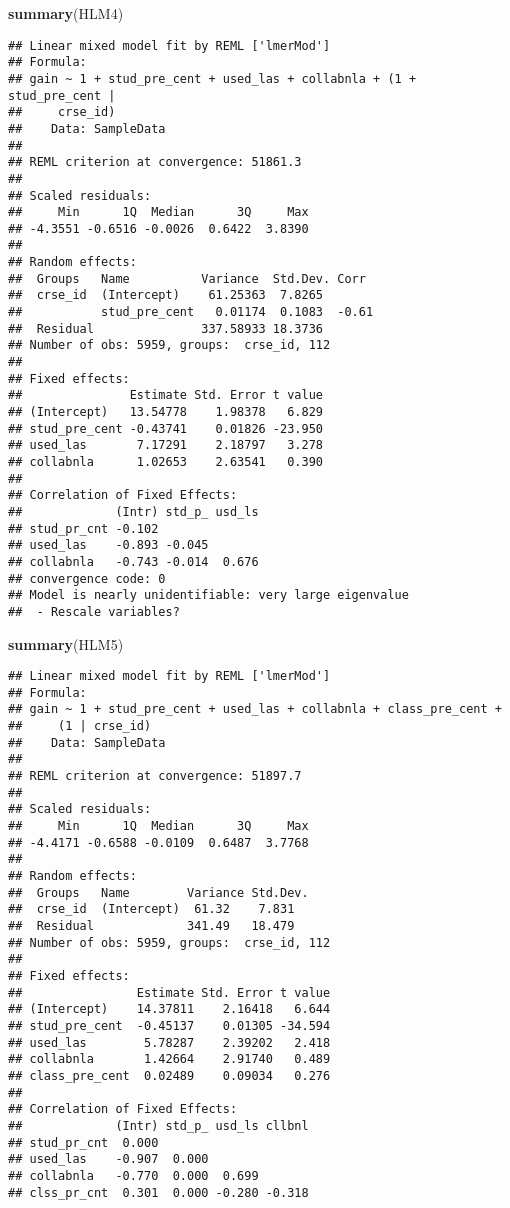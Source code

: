 \documentclass[]{article}
\newenvironment{Shaded}{\begin{snugshade}}{\end{snugshade}}
\newcommand{\KeywordTok}[1]{\textcolor[rgb]{0.13,0.29,0.53}{\textbf{#1}}}
\newcommand{\NormalTok}[1]{#1}
\begin{document}
\begin{Shaded}
\begin{Highlighting}[]
\KeywordTok{summary}\NormalTok{(HLM4)}
\end{Highlighting}
\end{Shaded}

\begin{verbatim}
## Linear mixed model fit by REML ['lmerMod']
## Formula: 
## gain ~ 1 + stud_pre_cent + used_las + collabnla + (1 + stud_pre_cent |  
##     crse_id)
##    Data: SampleData
## 
## REML criterion at convergence: 51861.3
## 
## Scaled residuals: 
##     Min      1Q  Median      3Q     Max 
## -4.3551 -0.6516 -0.0026  0.6422  3.8390 
## 
## Random effects:
##  Groups   Name          Variance  Std.Dev. Corr 
##  crse_id  (Intercept)    61.25363  7.8265       
##           stud_pre_cent   0.01174  0.1083  -0.61
##  Residual               337.58933 18.3736       
## Number of obs: 5959, groups:  crse_id, 112
## 
## Fixed effects:
##               Estimate Std. Error t value
## (Intercept)   13.54778    1.98378   6.829
## stud_pre_cent -0.43741    0.01826 -23.950
## used_las       7.17291    2.18797   3.278
## collabnla      1.02653    2.63541   0.390
## 
## Correlation of Fixed Effects:
##             (Intr) std_p_ usd_ls
## stud_pr_cnt -0.102              
## used_las    -0.893 -0.045       
## collabnla   -0.743 -0.014  0.676
## convergence code: 0
## Model is nearly unidentifiable: very large eigenvalue
##  - Rescale variables?
\end{verbatim}

\begin{Shaded}
\begin{Highlighting}[]
\KeywordTok{summary}\NormalTok{(HLM5)}
\end{Highlighting}
\end{Shaded}

\begin{verbatim}
## Linear mixed model fit by REML ['lmerMod']
## Formula: 
## gain ~ 1 + stud_pre_cent + used_las + collabnla + class_pre_cent +  
##     (1 | crse_id)
##    Data: SampleData
## 
## REML criterion at convergence: 51897.7
## 
## Scaled residuals: 
##     Min      1Q  Median      3Q     Max 
## -4.4171 -0.6588 -0.0109  0.6487  3.7768 
## 
## Random effects:
##  Groups   Name        Variance Std.Dev.
##  crse_id  (Intercept)  61.32    7.831  
##  Residual             341.49   18.479  
## Number of obs: 5959, groups:  crse_id, 112
## 
## Fixed effects:
##                Estimate Std. Error t value
## (Intercept)    14.37811    2.16418   6.644
## stud_pre_cent  -0.45137    0.01305 -34.594
## used_las        5.78287    2.39202   2.418
## collabnla       1.42664    2.91740   0.489
## class_pre_cent  0.02489    0.09034   0.276
## 
## Correlation of Fixed Effects:
##             (Intr) std_p_ usd_ls cllbnl
## stud_pr_cnt  0.000                     
## used_las    -0.907  0.000              
## collabnla   -0.770  0.000  0.699       
## clss_pr_cnt  0.301  0.000 -0.280 -0.318
\end{verbatim}
\end{document}

